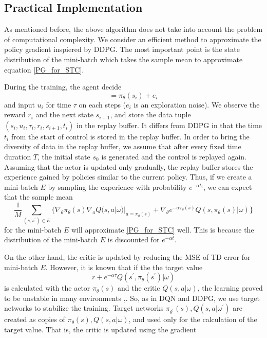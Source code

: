 \documentclass[english, dvipdfmx]{ampmt}             %
\begin{document}
\subsection{Practical Implementation}
As mentioned before, the above algorithm does not take into account the problem of computational complexity. We consider an efficient method to approximate the policy gradient inspiered by DDPG. The most important point is the state distribution of the mini-batch which takes the sample mean to approximate equation \eqref{PG_for_STC}. \par
During the training, the agent decide
\begin{equation}
	[u_i, \tau_i] = \pi_{\theta}(s_i) + e_i
\end{equation}
and input $u_i$ for time $\tau$ on each steps ($e_i$ is an exploration noise). We observe the reward $r_i$ and the next state $s_{i+1}$, and store the data tuple $(s_i, u_i, \tau_i, r_i, s_{i+1}, t_i)$ in the replay buffer. It differs from DDPG in that the time $t_i$ from the start of control is stored in the replay buffer. In order to bring the diversity of data in the replay buffer, we assume that after every fixed time duration $T$, the initial state $s_0$ is generated and the control is replayed again. Assuming that the actor is updated only gradually, the replay buffer stores the experience gained by policies similar to the current policy. Thus, if we create a mini-batch $E$ by sampling the experience with probability $e^{-\alpha t_i}$, we can expect that the sample mean
\begin{equation}
	\frac{1}{M}\sum_{(s, s^{\prime})\in E}\{\nabla_{\theta}\pi_{\theta}(s)\nabla_{a}Q(s,a|\omega)|_{a=\pi_{\theta}(s)}+\nabla_{\theta}e^{-\alpha\tau_{\theta}(s)}Q(s, \pi_{\theta}(s)|\omega)\} \label{app_pg_stc}
\end{equation}
for the mini-batch $E$ will approximate \eqref{PG_for_STC} well. This is because the distribution of the mini-batch $E$ is discounted for $e^{-\alpha t}$. \par
On the other hand, the critic is updated by reducing the MSE of TD error for mini-batch $E$. However, it is known that if the the target value 
\begin{equation}
	r + e^{-\alpha\tau}Q(s^{\prime}, \pi_{\theta}(s^{\prime})|\omega)
\end{equation}
is calculated with the actor $\pi_{\theta}(s)$ and the critic $Q(s,a|\omega)$, the learning proved to be unstable in many environments \cite{ETC},\cite{DDPG}. So, as in DQN and DDPG, we use target networks to stabilize the training. Target networks $\pi_{\theta^{\prime}}(s), Q(s,a|\omega^{\prime})$ are created as copies of $\pi_{\theta}(s), Q(s,a|\omega)$, and used only for the calculation of the target value. That is, the critic is updated using the gradient
\end{document}
